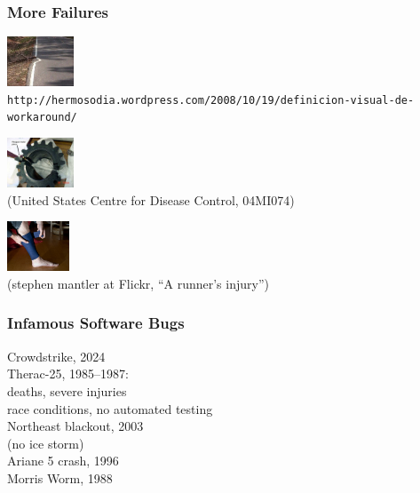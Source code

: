 \documentclass{beamer}
\newenvironment{changemargin}[1]{%
  \begin{list}{}{%
    \setlength{\topsep}{0pt}%
    \setlength{\leftmargin}{#1}%
    \setlength{\rightmargin}{1em}
    \setlength{\listparindent}{\parindent}%
    \setlength{\itemindent}{\parindent}%
    \setlength{\parsep}{\parskip}%
  }%
  \item[]}{\end{list}}
\begin{document}
\begin{frame}
  \frametitle{More Failures}




\begin{center}
\includegraphics[height=4em]{L01/workaround.jpg}\\
\tiny \tt http://hermosodia.wordpress.com/2008/10/19/definicion-visual-de-workaround/
\end{center}


\begin{center}
\includegraphics[height=4em]{L01/04MI074c.jpg}\\
\tiny (United States Centre for Disease Control, 04MI074)
\end{center}

\begin{center}
\includegraphics[height=4em]{L01/2873443918_ddc0337d19.jpg}\\
\tiny (stephen mantler at Flickr, ``A runner's injury'')
\end{center}

\end{frame}


\begin{frame}
  \frametitle{Infamous Software Bugs}
  \Large
  \begin{changemargin}{2em}
    Crowdstrike, 2024\\[1em]
    Therac-25, 1985--1987: \\
     deaths, severe injuries\\
    \qquad race conditions, no automated testing\\[1em]
    Northeast blackout, 2003\\
    \qquad (no ice storm)\\[1em]
    Ariane 5 crash, 1996\\[1em]
    Morris Worm, 1988
    
  \end{changemargin}
\end{frame}
\end{document}
